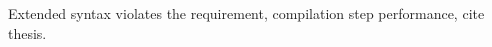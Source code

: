 \documentclass{acm_proc_article-sp}
\newcommand{\gls}[1]{#1}
\begin{document}

  
  Extended syntax violates the requirement, compilation step performance, cite thesis.

  
\end{document}
